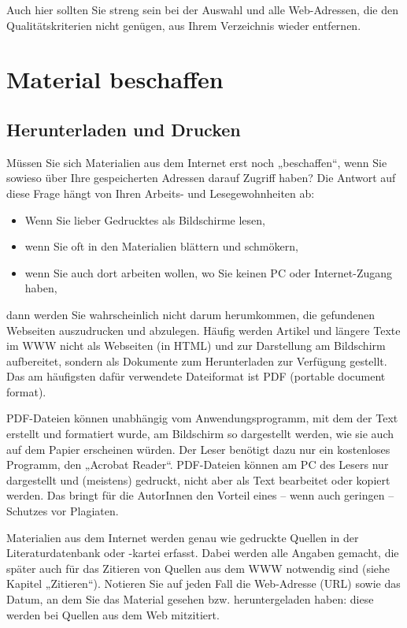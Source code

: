 \documentclass[]{book}
\providecommand{\tightlist}{%
  \setlength{\itemsep}{0pt}\setlength{\parskip}{0pt}}
\theoremstyle{definition}
\theoremstyle{definition}
\theoremstyle{definition}
\theoremstyle{remark}
\begin{document}
Auch hier sollten Sie streng sein bei der Auswahl und alle Web-Adressen,
die den Qualitätskriterien nicht genügen, aus Ihrem Verzeichnis wieder
entfernen.

\section{Material beschaffen}\label{material-beschaffen}

\subsection{Herunterladen und Drucken}\label{herunterladen-und-drucken}

Müssen Sie sich Materialien aus dem Internet erst noch „beschaffen``,
wenn Sie sowieso über Ihre gespeicherten Adressen darauf Zugriff haben?
Die Antwort auf diese Frage hängt von Ihren Arbeits- und
Lesegewohnheiten ab:

\begin{itemize}
\tightlist
\item
  Wenn Sie lieber Gedrucktes als Bildschirme lesen,
\item
  wenn Sie oft in den Materialien blättern und schmökern,
\item
  wenn Sie auch dort arbeiten wollen, wo Sie keinen PC oder
  Internet-Zugang haben,
\end{itemize}

dann werden Sie wahrscheinlich nicht darum herumkommen, die gefundenen
Webseiten auszudrucken und abzulegen. Häufig werden Artikel und längere
Texte im WWW nicht als Webseiten (in HTML) und zur Darstellung am
Bildschirm aufbereitet, sondern als Dokumente zum Herunterladen zur
Verfügung gestellt. Das am häufigsten dafür verwendete Dateiformat ist
PDF (portable document format).

PDF-Dateien können unabhängig vom Anwendungsprogramm, mit dem der Text
erstellt und formatiert wurde, am Bildschirm so dargestellt werden, wie
sie auch auf dem Papier erscheinen würden. Der Leser benötigt dazu nur
ein kostenloses Programm, den „Acrobat Reader``. PDF-Dateien können am
PC des Lesers nur dargestellt und (meistens) gedruckt, nicht aber als
Text bearbeitet oder kopiert werden. Das bringt für die AutorInnen den
Vorteil eines -- wenn auch geringen -- Schutzes vor Plagiaten.

Materialien aus dem Internet werden genau wie gedruckte Quellen in der
Literaturdatenbank oder -kartei erfasst. Dabei werden alle Angaben
gemacht, die später auch für das Zitieren von Quellen aus dem WWW
notwendig sind (siehe Kapitel „Zitieren``). Notieren Sie auf jeden Fall
die Web-Adresse (URL) sowie das Datum, an dem Sie das Material gesehen
bzw. heruntergeladen haben: diese werden bei Quellen aus dem Web
mitzitiert.
\end{document}
